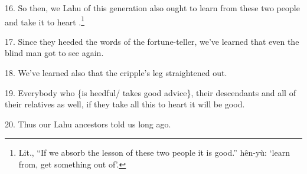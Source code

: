 16. So then, we Lahu of this generation also ought to learn from these two people
and take it to heart .\footnote{Lit., ``If we absorb the lesson of these two people it is good.'' hên-yù: `learn from, get something out of'.}

17. Since they heeded the words of the fortune-teller, we've learned that even
the blind man got to see again.

18. We've learned also that the cripple's leg straightened out.

19. Everybody who \{is heedful/ takes good advice\}, their descendants and all
of their relatives as well, if they take all this to heart it will be good.

20. Thus our Lahu ancestors told us long ago.

